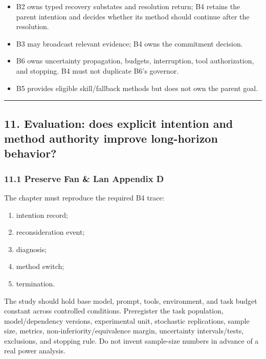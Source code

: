 \begin{itemize}
\tightlist
\item
  B2 owns typed recovery substates and resolution return; B4 retains the parent intention and decides whether its method should continue after the resolution.
\item
  B3 may broadcast relevant evidence; B4 owns the commitment decision.
\item
  B6 owns uncertainty propagation, budgets, interruption, tool authorization, and stopping. B4 must not duplicate B6's governor.
\item
  B5 provides eligible skill/fallback methods but does not own the parent goal.
\end{itemize}

\begin{center}\rule{0.5\linewidth}{0.5pt}\end{center}

\subsection{11. Evaluation: does explicit intention and method authority improve long-horizon behavior?}\label{evaluation-does-explicit-intention-and-method-authority-improve-long-horizon-behavior}

\subsubsection{11.1 Preserve Fan \& Lan Appendix D}\label{preserve-fan-lan-appendix-d}

The chapter must reproduce the required B4 trace:

\begin{enumerate}
\def\labelenumi{\arabic{enumi}.}
\tightlist
\item
  intention record;
\item
  reconsideration event;
\item
  diagnosis;
\item
  method switch;
\item
  termination.
\end{enumerate}

The study should hold base model, prompt, tools, environment, and task budget constant across controlled conditions. Preregister the task population, model/dependency versions, experimental unit, stochastic replications, sample size, metrics, non-inferiority/equivalence margin, uncertainty intervals/tests, exclusions, and stopping rule. Do not invent sample-size numbers in advance of a real power analysis.

